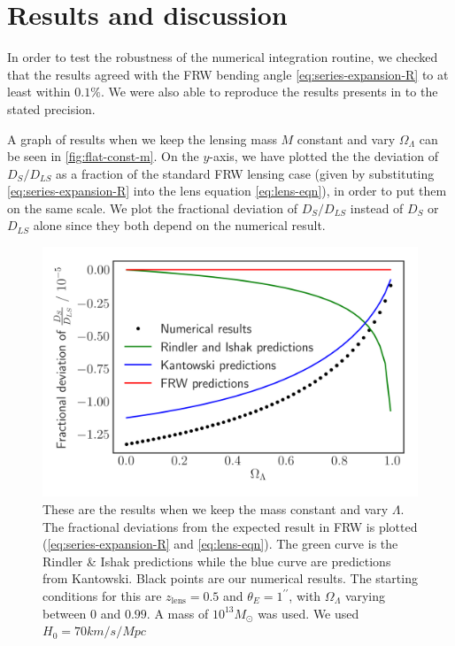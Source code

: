 \chapter{Results and discussion}
\label{chapter:results}

In order to test the robustness of the numerical integration routine, we checked that the results agreed with the FRW bending angle \autoref{eq:series-expansion-R} to at least within $0.1\%$. We were also able to reproduce the results presents in \citet{schucker2009strong} to the stated precision. 

A graph of results when we keep the lensing mass $M$ constant and vary $\Omega_{\Lambda}$ can be seen in \autoref{fig:flat-const-m}. On the $y$-axis, we have plotted the the deviation of $D_{S}/D_{LS}$ as a fraction of the standard FRW lensing case (given by substituting \autoref{eq:series-expansion-R} into the lens equation \ref{eq:lens-eqn}), in order to put them on the same scale. We plot the fractional deviation of $D_{S}/D_{LS}$ instead of $D_S$ or $D_{LS}$ alone since they both depend on the numerical result. 

\begin{figure}
  \centering
  \includegraphics[height=0.5\linewidth]{images/flat.png}
  \caption{These are the results when we keep the mass constant and vary $\Lambda$. The fractional deviations from the expected result in FRW is plotted (\autoref{eq:series-expansion-R} and \autoref{eq:lens-eqn}). The green curve is the Rindler \& Ishak predictions while the blue curve are predictions from Kantowski. Black points are our numerical results. The starting conditions for this are $z_{\text{lens}} = 0.5$ and $\theta_E = 1^{\prime\prime}$, with $\Omega_{\Lambda}$ varying between $0$ and $0.99$. A mass of $10^{13}M_{\odot}$ was used. We used $H_0 = 70 km/s/Mpc$}
  \label{fig:flat-const-m}
\end{figure}


